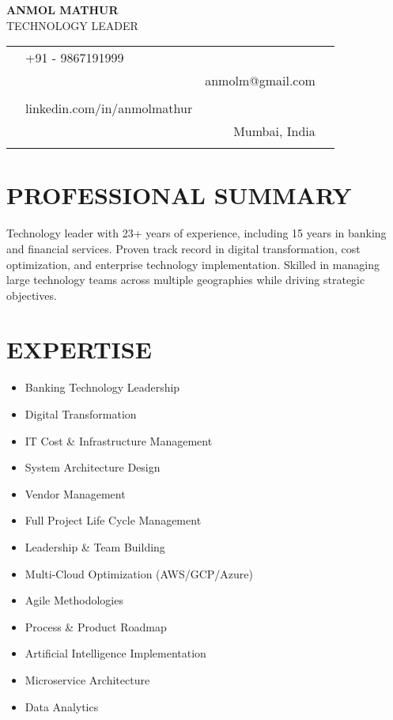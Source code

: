\documentclass[a4paper,11pt]{article}
\newcommand{\contactitem}[2]{\textbf{\small #1} & #2 \\}
\newcommand{\skillitem}[1]{\item[\textbullet] #1}
\begin{document}
\thispagestyle{empty}

\begin{center}
    \textbf{\Huge\color{primary} ANMOL MATHUR}\\
    \vspace{0.2em}
    {\Large\color{secondary} TECHNOLOGY LEADER}
\end{center}

\vspace{0.5em}
\begin{center}
\begin{tabular}{rl rl}
    \contactitem{\faPhone}{+91 - 9867191999} & \contactitem{\faEnvelope}{anmolm@gmail.com} \\
    \contactitem{\faLinkedin}{linkedin.com/in/anmolmathur} & \contactitem{\faMapMarker}{Mumbai, India} \\
\end{tabular}
\end{center}

\section{PROFESSIONAL SUMMARY}
Technology leader with 23+ years of experience, including 15 years in banking and financial services. Proven track record in digital transformation, cost optimization, and enterprise technology implementation. Skilled in managing large technology teams across multiple geographies while driving strategic objectives.

\section{EXPERTISE}
\begin{multicols}{2}
\begin{itemize}[leftmargin=*]
    \skillitem{Banking Technology Leadership}
    \skillitem{Digital Transformation}
    \skillitem{IT Cost \& Infrastructure Management}
    \skillitem{System Architecture Design}
    \skillitem{Vendor Management}
    \skillitem{Full Project Life Cycle Management}
    \skillitem{Leadership \& Team Building}
    \skillitem{Multi-Cloud Optimization (AWS/GCP/Azure)}
    \skillitem{Agile Methodologies}
    \skillitem{Process \& Product Roadmap}
    \skillitem{Artificial Intelligence Implementation}
    \skillitem{Microservice Architecture}
    \skillitem{Data Analytics}
\end{itemize}
\end{multicols}
\end{document}
